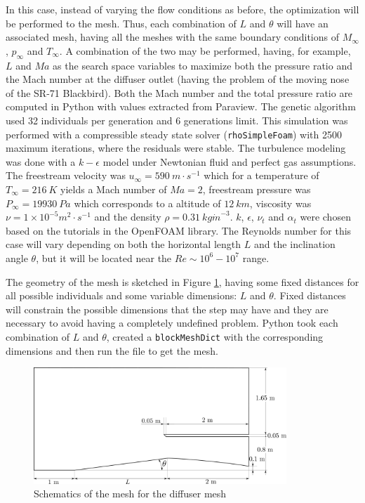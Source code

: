 In this case, instead of varying the flow conditions as before, the optimization will be performed to the mesh. Thus, each combination of $L$ and $\theta$ will have an associated mesh, having all the meshes with the same boundary conditions of $M_\infty$, $p_\infty$ and $T_\infty$. A combination of the two may be performed, having, for example, $L$ and $Ma$ as the search space variables to maximize both the pressure ratio and the Mach number at the diffuser outlet (having the problem of the moving nose of the SR-71 Blackbird).  Both the Mach number and the total pressure ratio are computed in Python with values extracted from Paraview. The genetic algorithm used 32 individuals per generation and 6 generations limit. This simulation was performed with a compressible steady state solver (\texttt{rhoSimpleFoam}) with 2500 maximum iterations, where the residuals were stable. The turbulence modeling was done with a $k-\epsilon$ model under Newtonian fluid and perfect gas assumptions. The freestream velocity was $u_\infty = 590\ m\cdot s^{-1}$ which for a temperature of $T_\infty=216\ K$ yields a Mach number of $Ma=2$, freestream pressure was $P_\infty=19930\ Pa$ which corresponds to a altitude of $12\ km$, viscosity was $\nu=1\times 10^{-5} m^2 \cdot s^{-1}$ and the density $\rho=0.31\ kg \dot m^{-3}$. $k$, $\epsilon$, $\nu_t$ and $\alpha_t$ were chosen based on the tutorials in the OpenFOAM library. The Reynolds number for this case will vary depending on both the horizontal length $L$ and the inclination angle $\theta$, but it will be located near the $Re \sim 10^6-10^7$ range.

\newpage

The geometry of the mesh is sketched in Figure \ref{fig:diffuserMesh}, having some fixed distances for all possible individuals and some variable dimensions: $L$ and $\theta$. Fixed distances will constrain the possible dimensions that the step may have and they are necessary to avoid having a completely undefined problem. Python took each combination of $L$ and $\theta$, created a \texttt{blockMeshDict} with the corresponding dimensions and then run the file to get the mesh. 

     \begin{figure}[h!]
        \centering
        \includegraphics[width=0.85\textwidth]{Figures/3/diffuserMesh.png}
        \caption{Schematics of the mesh for the diffuser mesh}
        \label{fig:diffuserMesh}
    \end{figure}

